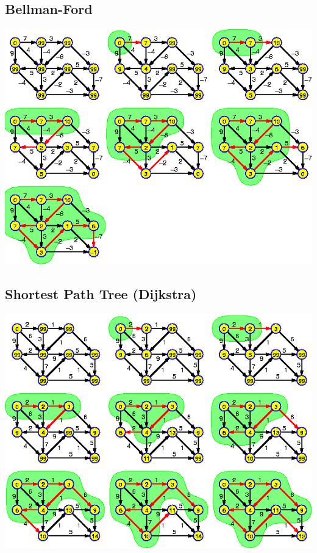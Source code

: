 \documentclass{article}
\begin{document}
\subsection{Bellman-Ford}

\centerline{\includegraphics[scale=0.6]{images/bellman_ford.png}\\[1cm]}



\subsection{Shortest Path Tree (Dijkstra)}


\centerline{\includegraphics[scale=0.6]{images/dijkstra.png}\\[1cm]}
\end{document}
